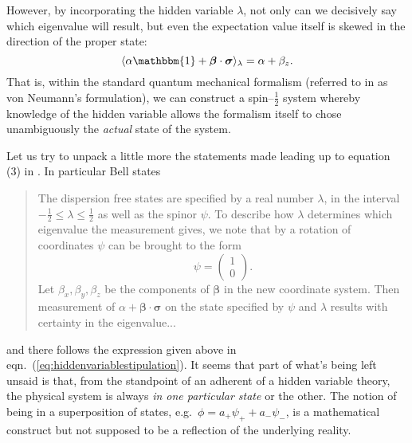 \documentclass[12pt]{article}
\begin{document}
However, by incorporating the hidden variable $\lambda$, not only can we decisively say which eigenvalue will result, but even the expectation value itself is skewed in the direction of the proper state:
\begin{displaymath}
  \langle \alpha \mathbbm{1} + \bm{\beta} \cdot \bm{\sigma} \rangle_{\lambda} = \alpha + \beta_z.
\end{displaymath}
That is, within the standard quantum mechanical formalism (referred to in \cite{Bell1966} as von Neumann's formulation), we can construct a spin--$\frac{1}{2}$ system whereby knowledge of the hidden variable allows the formalism itself to chose unambiguously the \emph{actual} state of the system.

Let us try to unpack a little more the statements made leading up to equation (3) in \cite[p.448]{Bell1966}. In particular Bell states
\begin{quotation}
  \begin{small}
    The dispersion free states are specified by a real number $\lambda$, in the interval $-\frac{1}{2} \le \lambda \le \frac{1}{2}$ as well as the spinor $\psi$. To describe how $\lambda$ determines which eigenvalue the measurement gives, we note that by a rotation of coordinates $\psi$ can be brought to the form
    \begin{displaymath}
      \psi =
      \begin{pmatrix}
        1 \\
        0
      \end{pmatrix}.
    \end{displaymath}
    Let $\beta_x, \beta_y, \beta_z$ be the components of $\bm{\beta}$ in the new coordinate system. Then measurement of $\alpha + \bm{\beta} \cdot \bm{\sigma}$ on the state specified by $\psi$ and $\lambda$ results with certainty in the eigenvalue...
  \end{small}
\end{quotation}
and there follows the expression given above in eqn.~(\ref{eq:hiddenvariablestipulation}). It seems that part of what's being left unsaid is that, from the standpoint of an adherent of a hidden variable theory, the physical system is always \emph{in one particular state} or the other. The notion of being in a superposition of states, e.g.\ $\phi = a_{+} \psi_{+} + a_{-} \psi_{-}$, is a mathematical construct but not supposed to be a reflection of the underlying reality.
\end{document}
